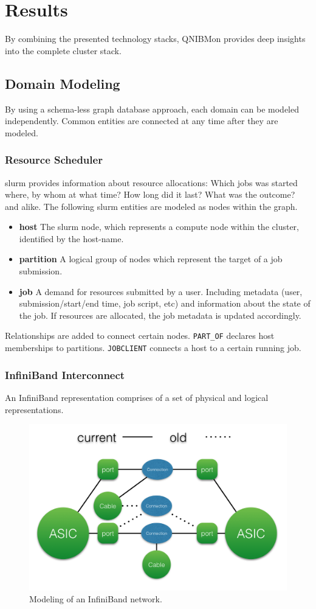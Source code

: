 \section{Results}
By combining the presented technology stacks, QNIBMon provides deep insights into the complete cluster stack.

\subsection{Domain Modeling}
By using a schema-less graph database approach, each domain can be modeled independently. Common entities are connected at any time after
they are modeled.

\subsubsection{Resource Scheduler}
\gls{slurm} provides information about resource allocations: Which jobs was started where, by whom at what time? How long did it last? What was the outcome? and alike.
The following \gls{slurm} entities are modeled as nodes within the graph.
\begin{itemize}
    \item \textbf{host} The \gls{slurm} node, which represents a compute node within the cluster, identified by the host-name.
    \item \textbf{partition} A logical group of nodes which represent the target of a job submission.
    \item \textbf{job} A demand for resources submitted by a user. Including metadata (user, submission/start/end time, job script, etc) and information about the state of the job. If resources are allocated, the job metadata is updated accordingly.
\end{itemize}
Relationships are added to connect certain nodes. \lstinline{PART_OF} declares host memberships to partitions. \lstinline{JOBCLIENT} connects a host to a certain running job.

\subsubsection{InfiniBand Interconnect}
An InfiniBand representation comprises of a set of physical and logical representations.
\begin{figure}[!ht]
    \includegraphics[width=.4\textwidth]{images/png/infiniband_graph.png}
    \caption{\label{fig:ib_graph}Modeling of an InfiniBand network.}
\end{figure}

